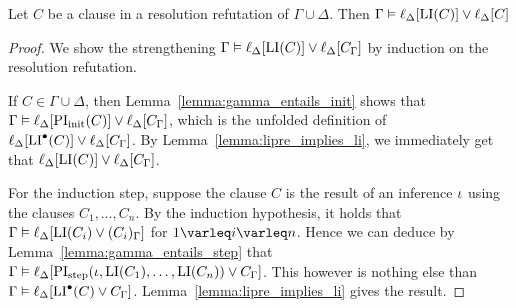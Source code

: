 \begin{comment}
		Let $x_s$ be a $\Delta$-lifting variable which occurs in $\lifdeltanovar{t}$. 
		Then by Lemma~\ref{lemma:lifting_conditions}, $x_s$ is not bound in $\LIpre(C)$.
	We show that $y_t$ is quantified in the scope of the quantification of $x_s$ by discussing the different possibilities for quantification of~$x_s$:

	\begin{itemize}
		\item
			Suppose that $s$ is lifted in $\LI(C)$ as well.
			Then by the definition of the quantifier prefix, the quantification of $x_s$ precedes the quantification for $x_t$ as $s$ is a subterm of $t$.

		\item
			Suppose that in some successor $C'$ of $C$, a successor $s'$ of $s$ is lifted.
			By Lemma~\ref{lemma:successor_li}, any quantifier of  $\LI(C)$, in particular $\exists y_t$, occurs in $\LI(C')$.
			As $s'$ is lifted in $\LI(C')$, the quantification $\forall x_{s'}$ is present in the quantifier prefix of $\LI(C')$. But then the quantifier for $y_t$ is in the scope of the quantifier of $x_{s'}$.

		\item
			Otherwise there is no successor $C'$ of $C$ such that a successor $s'$ of $s$ is lifted in $\LI(C')$.
			Then it is implicitly universally quantified.
			\qedhere
	\end{itemize}
\end{proof}
\end{comment}

\begin{lemma}
	\label{lemma:gamma_entails_delta_lifted_invariant}
	Let $C$ be a clause in a resolution refutation of $\Gamma \cup \Delta$.
	Then
	$\Gamma \vDash \ell_{\Delta}[ \operatorname{LI}(C) ] \lor \ell_{\Delta}[C] $
\end{lemma}
\begin{proof}
	We show the strengthening
	$\Gamma \vDash \ell_{\Delta}[ \operatorname{LI}(C) ] \lor \ell_{\Delta}[C_\Gamma]$ by induction on the resolution refutation.

	If $C\in \Gamma\cup\Delta$, then Lemma~\ref{lemma:gamma_entails_init} shows that $\Gamma \vDash \ell_{\Delta}[\operatorname{PI}_{\mathrm{init}}(C)] \lor \ell_{\Delta}[C_\Gamma]$, which is the unfolded definition of $\ell_{\Delta}[\operatorname{LI}^\bullet(C)] \lor \ell_{\Delta}[C_\Gamma]$.
	By Lemma~\ref{lemma:lipre_implies_li}, we immediately get that 
	$\ell_{\Delta}[\operatorname{LI}(C)] \lor \ell_{\Delta}[C_\Gamma]$.

	For the induction step, suppose the clause $C$ is the result of an inference $\iota$ using the clauses $C_1, \dots, C_n$.
	By the induction hypothesis, it holds that $\Gamma \entails \lifdeltanovar{\LI(C_i) \lor\nolinebreak (C_i)_\Gamma}$ for $1\varleq i\varleq n$. Hence
	we can deduce by Lemma~\ref{lemma:gamma_entails_step} that
	$\Gamma \vDash \ell_{\Delta}[\operatorname{PI}_{\mathrm{step}}(\iota, \operatorname{LI}(C_1), \dots, \operatorname{LI}(C_n)) \lor C_\Gamma]$.
	This however is nothing else than $\Gamma \vDash \ell_{\Delta}[\operatorname{LI}^\bullet(C) \lor C_\Gamma]$.
	Lemma~\ref{lemma:lipre_implies_li} gives the result.
\end{proof}

